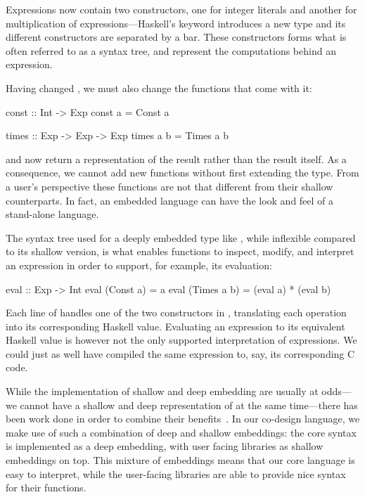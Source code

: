 \documentclass[../paper.tex]{subfiles}
\begin{document}
\noindent Expressions now contain two constructors, one for integer literals and another for multiplication of expressions---Haskell's  keyword introduces a new type and its different constructors are separated by a bar. These constructors forms what is often referred to as a syntax tree, and represent the computations behind an expression.

Having changed , we must also change the functions that come with it:

\begin{code}
const :: Int -> Exp
const a = Const a

times :: Exp -> Exp -> Exp
times a b = Times a b
\end{code}

\noindent {} and  now return a representation of the result rather than the result itself. As a consequence, we cannot add new functions without first extending the  type. From a user's perspective these functions are not that different from their shallow counterparts. In fact, an embedded language can have the look and feel of a stand-alone language.

The syntax tree used for a deeply embedded type like , while inflexible compared to its shallow version, is what enables functions to inspect, modify, and interpret an expression in order to support, for example, its evaluation:

\begin{code}
eval :: Exp -> Int
eval (Const a)   = a
eval (Times a b) = (eval a) * (eval b)
\end{code}

\noindent Each line of  handles one of the two constructors in , translating each operation into its corresponding Haskell value. Evaluating an expression to its equivalent Haskell value is however not the only supported interpretation of expressions. We could just as well have compiled the same expression to, say, its corresponding C code.

While the implementation of shallow and deep embedding are usually at odds---we cannot have a shallow and deep representation of  at the same time---there has been work done in order to combine their benefits~\cite{svenningsson2012}. In our co-design language, we make use of such a combination of deep and shallow embeddings: the core syntax is implemented as a deep embedding, with user facing libraries as shallow embeddings on top. This mixture of embeddings means that our core language is easy to interpret, while the user-facing libraries are able to provide nice syntax for their functions.
\end{document}
